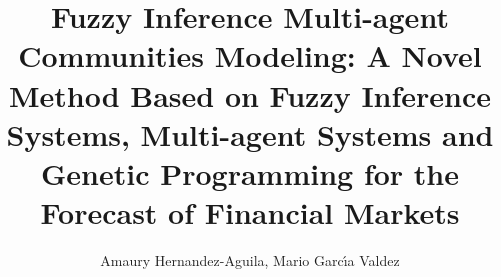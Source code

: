 \documentclass[12pt,journal,draftcls,onecolumn]{IEEEtran}
\begin{document}
%
\title{Fuzzy Inference Multi-agent Communities Modeling: A Novel Method Based
on Fuzzy Inference Systems, Multi-agent Systems and Genetic Programming
for the Forecast of Financial Markets}
%
%
%
%

\author{Amaury Hernandez-Aguila, Mario Garc{\'{\i}}a Valdez
}%


% 
%
\end{document}

